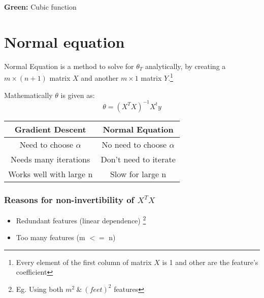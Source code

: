     \textbf {Green:} Cubic function

\section{Normal equation}
  Normal Equation is a method to solve for $\theta_T$ analytically, by creating a $m\times(n+1)$ matrix $X$ and another $m\times1$ matrix $Y$.\footnote[2]{Every element of the first column of matrix $X$ is 1 and other are the feature's coefficient}

  Mathematically $\theta$ is given as:
  \begin{equation} \label {eq: theta}
    \theta = (X^TX)^{-1}X^ty
  \end{equation}

  \begin{tabular}{ |c|c|}
    \hline
    \textbf{Gradient Descent} & \textbf{Normal Equation} \\
    \hline
    Need to choose $\alpha$ & No need to choose $\alpha$ \\
    Needs many iterations & Don't need to iterate \\
    Works well with large n & Slow for large n \\
    \hline
  \end{tabular}

  \vspace{5mm}

  \subsubsection{Reasons for non-invertibility of $X^T X$}
    \begin{itemize}
      \item Redundant features (linear dependence) \footnote[3]{Eg. Using both $m^2 \  \& \  (feet)^2$ features}
      \item Too many features (m $<=$ n) 
    \end{itemize}
  
